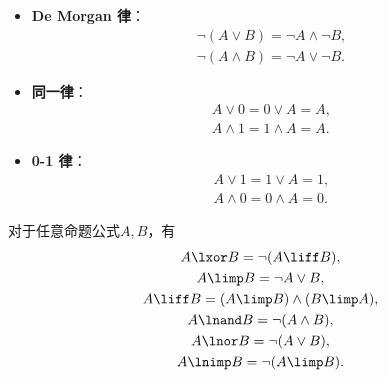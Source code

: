 \begin{theorem}
\begin{itemize}
	\item {\rm\bf De Morgan 律}：\begin{gather}
		\neg(A \lor B) = \neg A \land \neg B, \\
		\neg(A \land B) = \neg A \lor \neg B.
	\end{gather}

	\item {\rm\bf 同一律}：\begin{gather}
		A \lor 0 = 0 \lor A = A, \\
		A \land 1 = 1 \land A = A.
	\end{gather}

	\item {\rm\bf 0-1 律}：\begin{gather}
		A \lor 1 = 1 \lor A = 1, \\
		A \land 0 = 0 \land A = 0.
	\end{gather}
\end{itemize}
\end{theorem}

\begin{theorem}
对于任意命题公式\(A,B\)，有\begin{gather}
	A \lxor B
	= \neg(A \liff B),
		\label{equation:数理逻辑.联结词等值式1} \\
	A \limp B
	= \neg A \lor B,
		\label{equation:数理逻辑.联结词等值式2} \\
	A \liff B
	= (A \limp B) \land (B \limp A),
		\label{equation:数理逻辑.联结词等值式3} \\
	A \lnand B
	= \neg(A \land B),
		\label{equation:数理逻辑.联结词等值式4} \\
	A \lnor B
	= \neg(A \lor B),
		\label{equation:数理逻辑.联结词等值式5} \\
	A \lnimp B
	= \neg(A \limp B).
		\label{equation:数理逻辑.联结词等值式6}
\end{gather}
\end{theorem}

